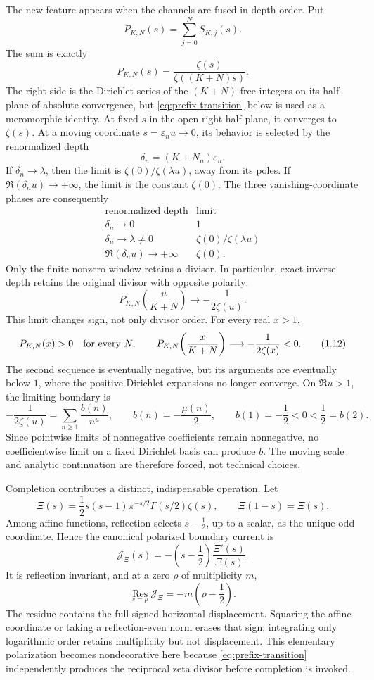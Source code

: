 \documentclass[11pt]{article}
\theoremstyle{definition}
\theoremstyle{remark}
\begin{document}
The new feature appears when the channels are fused in depth order.  Put
\[
 P_{K,N}(s)=\sum_{j=0}^{N}S_{K,j}(s).
 \tag{1.7}
\]
The sum is exactly
\[
 P_{K,N}(s)=\frac{\zeta(s)}{\zeta((K+N)s)}.
 \tag{1.8}
\]
The right side is the Dirichlet series of the \((K+N)\)-free integers on its half-plane of
absolute convergence, but \eqref{eq:prefix-transition} below is used as a meromorphic identity.
At fixed \(s\) in the open right half-plane, it converges to \(\zeta(s)\).  At a moving
coordinate \(s=\varepsilon_nu\to0\), its behavior is selected by the renormalized depth
\[
 \delta_n=(K+N_n)\varepsilon_n.
 \tag{1.9}
\]
If \(\delta_n\to\lambda\), then the limit is
\(\zeta(0)/\zeta(\lambda u)\), away from its poles.  If
\(\Re(\delta_nu)\to+\infty\), the limit is the constant \(\zeta(0)\).
The three vanishing-coordinate phases are consequently
\[
\begin{array}{c|c}
\text{renormalized depth}&\text{limit}\\ \hline
\delta_n\to0&1\\
\delta_n\to\lambda\ne0&\zeta(0)/\zeta(\lambda u)\\
\Re(\delta_nu)\to+\infty&\zeta(0).
\end{array}
\tag{1.10}
\]
Only the finite nonzero window retains a divisor.  In particular, exact inverse depth retains
the original divisor with opposite polarity:
\[
 P_{K,N}\!\left(\frac{u}{K+N}\right)
 \longrightarrow-\frac1{2\zeta(u)}.
 \tag{1.11}
\]
This limit changes sign, not only divisor order.  For every real \(x>1\),
\[
 P_{K,N}(x)>0\quad\hbox{for every }N,
 \qquad
 P_{K,N}\!\left(\frac{x}{K+N}\right)
 \longrightarrow-\frac1{2\zeta(x)}<0.
 \tag{1.12}
\]
The second sequence is eventually negative, but its arguments are eventually below \(1\), where
the positive Dirichlet expansions no longer converge.  On \(\Re u>1\), the limiting boundary is
\[
 -\frac1{2\zeta(u)}
 =\sum_{n\geq1}\frac{b(n)}{n^u},
 \qquad b(n)=-\frac{\mu(n)}2,
 \qquad b(1)=-\frac12<0<\frac12=b(2).
 \tag{1.13}
\]
Since pointwise limits of nonnegative coefficients remain nonnegative, no coefficientwise limit
on a fixed Dirichlet basis can produce \(b\).  The moving scale and analytic continuation are
therefore forced, not technical choices.

Completion contributes a distinct, indispensable operation.  Let
\[
 \Xi(s)=\frac12s(s-1)\pi^{-s/2}\Gamma(s/2)\zeta(s),
 \qquad \Xi(1-s)=\Xi(s).
 \tag{1.14}
\]
Among affine functions, reflection selects \(s-\tfrac12\), up to a scalar, as the unique odd
coordinate.  Hence the canonical polarized boundary current is
\[
 \mathcal J_\Xi(s)
 =-\left(s-\frac12\right)\frac{\Xi'(s)}{\Xi(s)}.
 \tag{1.15}
\]
It is reflection invariant, and at a zero \(\rho\) of multiplicity \(m\),
\[
 \operatorname*{Res}_{s=\rho}\mathcal J_\Xi
 =-m\left(\rho-\frac12\right).
 \tag{1.16}
\]
The residue contains the full signed horizontal displacement.  Squaring the affine coordinate
or taking a reflection-even norm erases that sign; integrating only logarithmic order retains
multiplicity but not displacement.  This elementary polarization becomes nondecorative here
because \eqref{eq:prefix-transition} independently produces the reciprocal zeta divisor before
completion is invoked.
\end{document}
